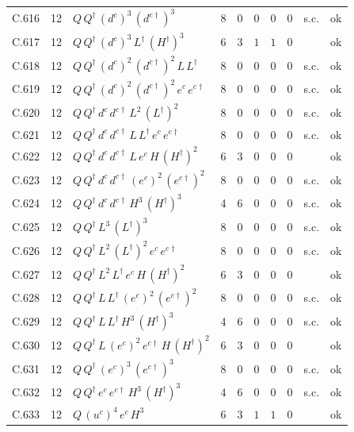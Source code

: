 {\begin{longtable}{@{}ll>{\raggedright\arraybackslash}p{6.4cm}rrllllr@{}}
C.616 & 12 & $Q\,Q^\dagger\,(d^c)^{3}\,(d^{c\dagger})^{3}$ & 8 & 0 & $0$ & $0$ & $0$ & s.c. & ok \\
C.617 & 12 & $Q\,Q^\dagger\,(d^c)^{3}\,L^\dagger\,(H^\dagger)^{3}$ & 6 & 3 & $1$ & $1$ & $0$ &  & ok \\
C.618 & 12 & $Q\,Q^\dagger\,(d^c)^{2}\,(d^{c\dagger})^{2}\,L\,L^\dagger$ & 8 & 0 & $0$ & $0$ & $0$ & s.c. & ok \\
C.619 & 12 & $Q\,Q^\dagger\,(d^c)^{2}\,(d^{c\dagger})^{2}\,e^c\,e^{c\dagger}$ & 8 & 0 & $0$ & $0$ & $0$ & s.c. & ok \\
C.620 & 12 & $Q\,Q^\dagger\,d^c\,d^{c\dagger}\,L^{2}\,(L^\dagger)^{2}$ & 8 & 0 & $0$ & $0$ & $0$ & s.c. & ok \\
C.621 & 12 & $Q\,Q^\dagger\,d^c\,d^{c\dagger}\,L\,L^\dagger\,e^c\,e^{c\dagger}$ & 8 & 0 & $0$ & $0$ & $0$ & s.c. & ok \\
C.622 & 12 & $Q\,Q^\dagger\,d^c\,d^{c\dagger}\,L\,e^c\,H\,(H^\dagger)^{2}$ & 6 & 3 & $0$ & $0$ & $0$ &  & ok \\
C.623 & 12 & $Q\,Q^\dagger\,d^c\,d^{c\dagger}\,(e^c)^{2}\,(e^{c\dagger})^{2}$ & 8 & 0 & $0$ & $0$ & $0$ & s.c. & ok \\
C.624 & 12 & $Q\,Q^\dagger\,d^c\,d^{c\dagger}\,H^{3}\,(H^\dagger)^{3}$ & 4 & 6 & $0$ & $0$ & $0$ & s.c. & ok \\
C.625 & 12 & $Q\,Q^\dagger\,L^{3}\,(L^\dagger)^{3}$ & 8 & 0 & $0$ & $0$ & $0$ & s.c. & ok \\
C.626 & 12 & $Q\,Q^\dagger\,L^{2}\,(L^\dagger)^{2}\,e^c\,e^{c\dagger}$ & 8 & 0 & $0$ & $0$ & $0$ & s.c. & ok \\
C.627 & 12 & $Q\,Q^\dagger\,L^{2}\,L^\dagger\,e^c\,H\,(H^\dagger)^{2}$ & 6 & 3 & $0$ & $0$ & $0$ &  & ok \\
C.628 & 12 & $Q\,Q^\dagger\,L\,L^\dagger\,(e^c)^{2}\,(e^{c\dagger})^{2}$ & 8 & 0 & $0$ & $0$ & $0$ & s.c. & ok \\
C.629 & 12 & $Q\,Q^\dagger\,L\,L^\dagger\,H^{3}\,(H^\dagger)^{3}$ & 4 & 6 & $0$ & $0$ & $0$ & s.c. & ok \\
C.630 & 12 & $Q\,Q^\dagger\,L\,(e^c)^{2}\,e^{c\dagger}\,H\,(H^\dagger)^{2}$ & 6 & 3 & $0$ & $0$ & $0$ &  & ok \\
C.631 & 12 & $Q\,Q^\dagger\,(e^c)^{3}\,(e^{c\dagger})^{3}$ & 8 & 0 & $0$ & $0$ & $0$ & s.c. & ok \\
C.632 & 12 & $Q\,Q^\dagger\,e^c\,e^{c\dagger}\,H^{3}\,(H^\dagger)^{3}$ & 4 & 6 & $0$ & $0$ & $0$ & s.c. & ok \\
C.633 & 12 & $Q\,(u^c)^{4}\,e^c\,H^{3}$ & 6 & 3 & $1$ & $1$ & $0$ &  & ok \\

\end{longtable}}
